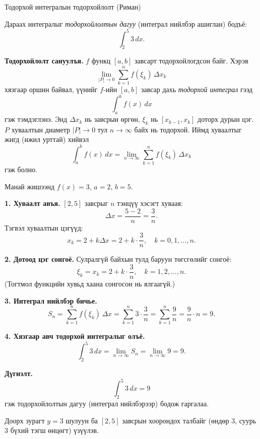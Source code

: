 \begin{frame}[allowframebreaks]{Тодорхой интегралын тодорхойлолт (Риман)}
\begin{example}
Дараах интегралыг \emph{тодорхойлолтын дагуу} (интеграл нийлбэр ашиглан) бодъё:
\[
\int_{2}^{5} 3\,dx.
\]

\textbf{Тодорхойлолт сануулъя.} \;
$f$ функц $[a,b]$ завсарт тодорхойлогдсон байг. Хэрэв
\[
\lim_{|P|\to 0} \sum_{k=1}^{n} f(\xi_k)\,\Delta x_k
\]
хязгаар оршин байвал, үүнийг $f$-ийн $[a,b]$ завсар дахь \emph{тодорхой интеграл} гээд
\[
\int_a^b f(x)\,dx
\]
гэж тэмдэглэнэ. Энд $\Delta x_k$ нь завсрын өргөн, $\xi_k$ нь $[x_{k-1},x_k]$ доторх дурын цэг. $P$ хуваалтын диаметр $|P|\to 0$ тул $n\to\infty$ байх нь тодорхой. Иймд хуваалтыг жигд (ижил урттай) хийвэл \[
\int_a^b f(x)\,dx=\lim_{n\to\infty} \sum_{k=1}^{n} f(\xi_k)\,\Delta x_k
\]
гэж болно.
\medskip

Манай жишээнд $f(x)=3$, $a=2$, $b=5$.

\textbf{1. Хуваалт авъя.} \;
$[2,5]$ завсрыг $n$ тэнцүү хэсэгт хуваая:
\[
\Delta x = \frac{5-2}{n} = \frac{3}{n}.
\]
Тэгвэл хуваалтын цэгүүд:
\[
x_k = 2 + k\Delta x = 2 + k\cdot\frac{3}{n},\quad k=0,1,\dots,n.
\]

\textbf{2. Дотоод цэг сонгоё.} \;
Сулралгүй байхын тулд баруун төгсгөлийг сонгоё:
\[
\xi_k = x_k = 2 + k\cdot\frac{3}{n},\quad k=1,2,\dots,n.
\]
(Тогтмол функцийн хувьд хаана сонгосон нь ялгаагүй.)

\textbf{3. Интеграл нийлбэр бичье.}
\[
S_n
=
\sum_{k=1}^{n} f(\xi_k)\,\Delta x
=
\sum_{k=1}^{n} 3\cdot\frac{3}{n}
=
\sum_{k=1}^{n} \frac{9}{n}
=
\frac{9}{n}\cdot n
=
9.
\]

\textbf{4. Хязгаар авч тодорхой интегралыг олъё.}
\[
\int_{2}^{5} 3\,dx
=
\lim_{n\to\infty} S_n
=
\lim_{n\to\infty} 9
=
9.
\]

\textbf{Дүгнэлт.}
\[
\boxed{\int_{2}^{5} 3\,dx = 9}
\]
гэж тодорхойлолтын дагуу (интеграл нийлбэрээр) бодож гаргалаа.

\medskip

Доорх зурагт $y=3$ шулуун ба $[2,5]$ завсрын хоорондох талбайг (өндөр $3$, суурь $3$ бүхий тэгш өнцөгт) үзүүлэв.

\begin{center}
\begin{fitbox}
\end{fitbox}
\end{center}
\end{example}
\end{frame}
